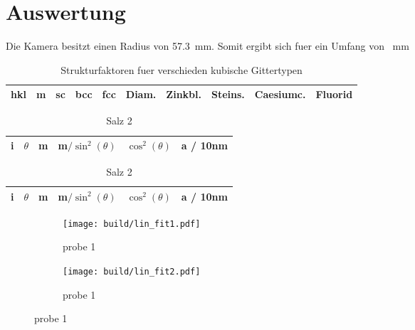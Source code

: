 \section{Auswertung}\label{sec:Auswertung}

Die Kamera besitzt einen Radius von \SI{57.3}{\milli\meter}.
Somit ergibt sich fuer ein Umfang von \SI{}{\milli\meter}

\begin{table}[h]
		\centering
		\caption{Strukturfaktoren fuer verschieden kubische Gittertypen}
		\label{tab:label}
		\begin{tabular}{c c c c c c c c c c}
				\toprule
				hkl & m & sc & bcc & fcc & Diam. & Zinkbl. & Steins. & Caesiumc. & Fluorid \\ 
				\midrule
					
				\bottomrule
		\end{tabular}
\end{table}

\begin{table}[h]
		\centering
		\caption{Reflexe der Proben}
		\label{tab:label}
		\begin{subtable}{0.9\textwidth}
				\centering
				\caption{Probe 2}
				\begin{tabular}{c c c c c c}
						\toprule
						i & $\theta$ & m & m$/\sin^2(\theta)$ & $\cos^2(\theta)$ & a / 10nm \\ 
						\midrule
						
						\bottomrule
				\end{tabular}
		\end{subtable}
		\begin{subtable}{0.9\textwidth}
				\centering
				\caption{Salz 2}
				\begin{tabular}{c c c c c c}
						\toprule
						i & $\theta$ & m & m$/\sin^2(\theta)$ & $\cos^2(\theta)$ & a / 10nm \\ 
						\midrule
						
						\bottomrule
				\end{tabular}
		\end{subtable}
\end{table}

\begin{figure}[h]
		\centering
		\begin{subfigure}{0.49\textwidth}
				\centering
				\texttt{[image: build/lin\_fit1.pdf]}
				\caption{probe 1}
				\label{fig:prb1}
		\end{subfigure}
		\begin{subfigure}{0.49\textwidth}
				\centering
				\texttt{[image: build/lin\_fit2.pdf]}
				\caption{probe 1}
				\label{fig:prb1}
		\end{subfigure}
\end{figure}
